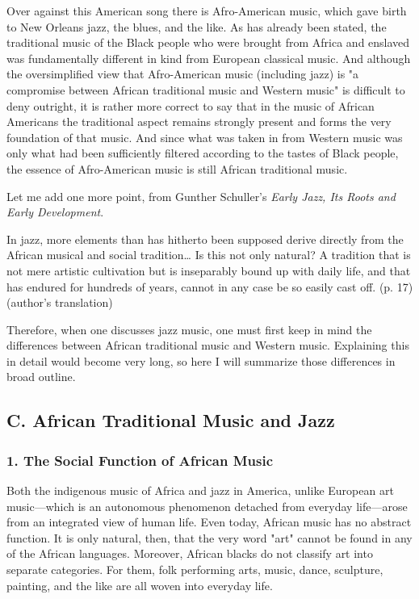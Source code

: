 Over against this American song there is Afro-American music, which gave birth to New Orleans jazz, the blues, and the like. As has already been stated, the traditional music of the Black people who were brought from Africa and enslaved was fundamentally different in kind from European classical music. And although the oversimplified view that Afro-American music (including jazz) is "a compromise between African traditional music and Western music" is difficult to deny outright, it is rather more correct to say that in the music of African Americans the traditional aspect remains strongly present and forms the very foundation of that music. And since what was taken in from Western music was only what had been sufficiently filtered according to the tastes of Black people, the essence of Afro-American music is still African traditional music.

Let me add one more point, from Gunther Schuller's \textit{Early Jazz, Its Roots and Early Development}.

\begin{gquote}
In jazz, more elements than has hitherto been supposed derive directly from the African musical and social tradition… Is this not only natural? A tradition that is not mere artistic cultivation but is inseparably bound up with daily life, and that has endured for hundreds of years, cannot in any case be so easily cast off. (p. 17) (author's translation)
\end{gquote}

Therefore, when one discusses jazz music, one must first keep in mind the differences between African traditional music and Western music. Explaining this in detail would become very long, so here I will summarize those differences in broad outline.

\subsection{C. African Traditional Music and Jazz}

\subsubsection{1. The Social Function of African Music}

Both the indigenous music of Africa and jazz in America, unlike European art music—which is an autonomous phenomenon detached from everyday life—arose from an integrated view of human life. Even today, African music has no abstract function. It is only natural, then, that the very word "art" cannot be found in any of the African languages. Moreover, African blacks do not classify art into separate categories. For them, folk performing arts, music, dance, sculpture, painting, and the like are all woven into everyday life.


